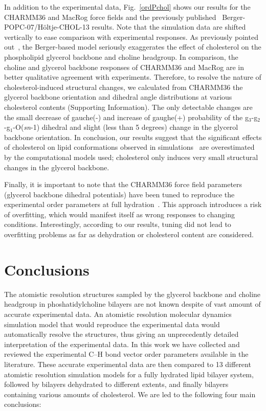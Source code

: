 \documentclass[journal=jpcbfk,manuscript=article]{achemso}
\begin{document}
In addition to the experimental data, Fig.~\ref{ordPchol} shows
our results for the CHARMM36 and MacRog force fields
and the previously published~\cite{ferreira13}
Berger-POPC-07/H\"oltje-CHOL-13 results.
Note that the simulation data are shifted vertically to ease comparison with experimental responses.
As previously pointed out~\cite{ferreira13}, the Berger-based model
seriously exaggerates the effect of cholesterol on the phospholipid glycerol backbone and choline headgroup.
In comparison, the choline and glycerol backbone responses of CHARMM36 and MacRog are in better qualitative 
agreement with experiments. 
Therefore, to resolve the nature of cholesterol-induced structural changes,
we calculated from CHARMM36 the glycerol backbone orientation and dihedral angle distributions
at various cholesterol contents (Supporting Information). The only detectable changes
are the small decrease of gauche(-) and increase of gaughe(+) probability of 
the g$_3$-g$_2$-g$_1$-O(\textit{sn}-1) dihedral and slight (less than 5 degrees) change
in the glycerol backbone orientation. In conclusion, our results suggest that the significant 
effects of cholesterol on lipid conformations observed in simulations~\cite{zhu07,rog09,alwarawrah12} 
are overestimated by the computational models used;
cholesterol only induces very small structural changes in the glycerol backbone.

Finally, it is important to note that the CHARMM36 force field parameters (glycerol backbone dihedral potentials)
have been tuned to reproduce the experimental order parameters at full hydration~\cite{klauda10}. 
This approach introduces a risk of overfitting, which would manifest itself as wrong responses to changing conditions. 
Interestingly, according to our results, tuning did not lead to overfitting problems as far as dehydration or cholesterol content are considered. 


\pagebreak
\section{Conclusions}
The atomistic resolution structures sampled by the glycerol backbone and choline headgroup
in phoshatidylcholine bilayers are not known despite of vast amount of accurate experimental
data. An atomistic resolution molecular dynamics simulation model that would reproduce the
experimental data would automatically resolve the structures, thus giving an unprecedently detailed interpretation of the experimental data.
In this work we have collected and reviewed the experimental C--H bond vector order
parameters available in the literature. These accurate experimental data are then compared to 13
different atomistic resolution simulation models for a fully hydrated lipid bilayer system, followed by bilayers dehydrated to different extents, and
finally bilayers containing various amounts of cholesterol. We are led to the following four main conclusions:
\end{document}
